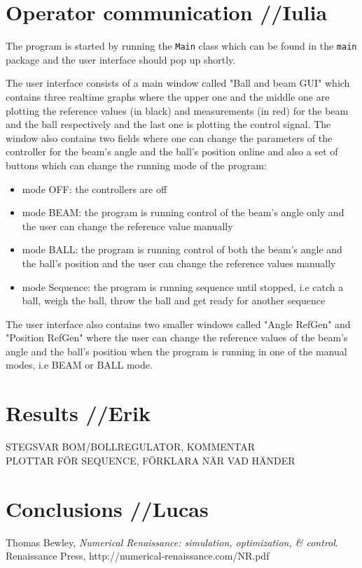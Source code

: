 \documentclass{article}
\begin{document}
\section{Operator communication //Iulia}\label{OpCom}
The program is started by running the \texttt{Main} class which can be found in the \texttt{main} package and the user interface should pop up shortly.

The user interface consists of a main window called "Ball and beam GUI" which contains three realtime graphs where the upper one and the middle one are plotting the reference values (in black) and measurements (in red) for the beam and the ball respectively and the last one is plotting the control signal. The window also contains two fields where one can change the parameters of the controller for the beam's angle and the ball's position online and also a set of buttons which can change the running mode of the program:
\begin{itemize}
\item mode OFF: the controllers are off
\item mode BEAM: the program is running control of the beam's angle only and the user can change the reference value manually
\item mode BALL: the program is running control of both the beam's angle and the ball's position and the user can change the reference values manually
\item mode Sequence: the program is running sequence until stopped, i.e catch a ball, weigh the ball, throw the ball and get ready for another sequence
\end{itemize}

The user interface also contains two smaller windows called "Angle RefGen" and "Position RefGen" where the user can change the reference values of the beam's angle and the ball's position when the program is running in one of the manual modes, i.e BEAM or BALL mode.
\section{Results //Erik}
STEGSVAR BOM/BOLLREGULATOR, KOMMENTAR \\
PLOTTAR FÖR SEQUENCE, FÖRKLARA NÄR VAD HÄNDER \\

\section{Conclusions //Lucas}


\newpage
\begin{thebibliography}{9}
  Thomas Bewley,
  \emph{Numerical Renaissance: simulation, optimization, \& control}.
  Renaissance Press,
  http://numerical-renaissance.com/NR.pdf

\end{thebibliography}
\end{document}
